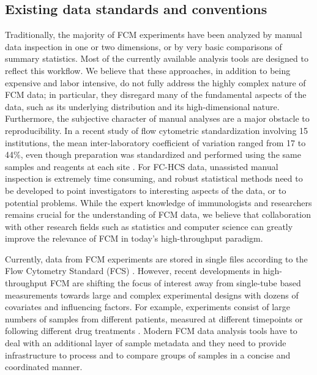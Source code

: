 \documentclass[12pt]{article}
\begin{document}
\subsection*{Existing data standards and conventions}
Traditionally, the majority of FCM experiments have been analyzed by
manual data inspection in one or two dimensions, or by very basic
comparisons of summary statistics. Most of the currently available
analysis tools are designed to reflect this workflow.  We believe that
these approaches, in addition to being expensive and labor intensive,
do not fully address the highly complex nature of FCM data; in
particular, they disregard many of the fundamental aspects of the
data, such as its underlying distribution and its high-dimensional
nature. Furthermore, the subjective character of manual analyses are a
major obstacle to reproducibility. In a recent study of flow
cytometric standardization involving 15 institutions, the mean
inter-laboratory coefficient of variation ranged from 17 to 44\%, even
though preparation was standardized and performed using the same
samples and reagents at each site \citep{Maecker2005}. For FC-HCS
data, unassisted manual inspection is extremely time consuming, and
robust statistical methods need to be developed to point investigators
to interesting aspects of the data, or to potential problems. While
the expert knowledge of immunologists and researchers remains crucial
for the understanding of FCM data, we believe that collaboration with
other research fields such as statistics and computer science can
greatly improve the relevance of FCM in today's high-throughput
paradigm.

Currently, data from FCM experiments are stored in single files
according to the Flow Cytometry Standard (FCS) \citep{seamer1997pnd}.
However, recent developments in high-throughput FCM are shifting the
focus of interest away from single-tube based measurements towards
large and complex experimental designs with dozens of covariates and
influencing factors. For example, experiments consist of large numbers
of samples from different patients, measured at different timepoints
\citep{brinkman2007hcf} or following different drug treatments
\citep{gasparetto2004ice}. Modern FCM data analysis tools have to deal
with an additional layer of sample metadata and they need to provide
infrastructure to process and to compare groups of samples in a
concise and coordinated manner.
\end{document}
